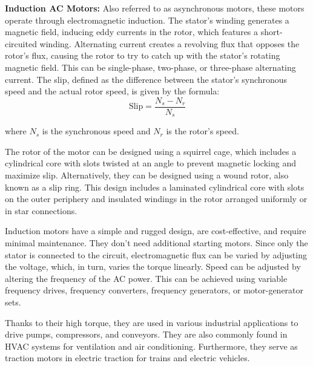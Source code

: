 \documentclass{article}
\begin{document}
\begin{flushleft}
 \textbf{Induction AC Motors:} Also referred to as asynchronous motors, these motors operate through electromagnetic induction. The stator's winding generates a magnetic field, inducing eddy currents in the rotor, which features a short-circuited winding. Alternating current creates a revolving flux that opposes the rotor's flux, causing the rotor to try to catch up with the stator's rotating magnetic field. This can be single-phase, two-phase, or three-phase alternating current. The slip, defined as the difference between the stator's synchronous speed and the actual rotor speed, is given by the formula:
\[ \text{Slip} = \frac{{N_s - N_r}}{{N_s}} \]

where \( N_s \) is the synchronous speed and \( N_r \) is the rotor's speed.

The rotor of the motor can be designed using a squirrel cage, which includes a cylindrical core with slots twisted at an angle to prevent magnetic locking and maximize slip. Alternatively, they can be designed using a wound rotor, also known as a slip ring. This design includes a laminated cylindrical core with slots on the outer periphery and insulated windings in the rotor arranged uniformly or in star connections. \newline

Induction motors have a simple and rugged design, are cost-effective, and require minimal maintenance. They don't need additional starting motors. Since only the stator is connected to the circuit, electromagnetic flux can be varied by adjusting the voltage, which, in turn, varies the torque linearly. Speed can be adjusted by altering the frequency of the AC power. This can be achieved using variable frequency drives, frequency converters, frequency generators, or motor-generator sets. \newline

Thanks to their high torque, they are used in various industrial applications to drive pumps, compressors, and conveyors. They are also commonly found in HVAC systems for ventilation and air conditioning. Furthermore, they serve as traction motors in electric traction for trains and electric vehicles. \newline

\end{flushleft}
\end{document}
